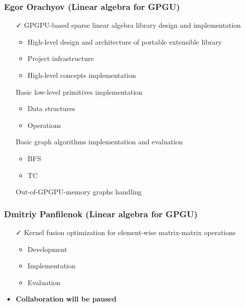 \documentclass[xcolor=table,aspectratio=169]{beamer}
\begin{document}
\begin{frame}[fragile]
  \frametitle{Egor Orachyov (Linear algebra for GPGU)}
  \begin{minipage}[t]{0.48\textwidth}
    \begin{itemize}
      \item[\faCheck] GPGPU-based sparse linear algebra library design and implementation 
      \begin{itemize}
        \item High-level design and architecture of portable extensible library 
        \item Project infrastructure
        \item High-level concepts implementation
      \end{itemize}
    \end{itemize}
  \end{minipage}
  \pause
  \begin{minipage}[t]{0.49\textwidth}
    \begin{itemize}
      \item[\faHourglassHalf] Basic low-level primitives implementation
      \begin{itemize}
        \item Data structures
        \item Operations
      \end{itemize}
      \item[\faHourglassHalf] Basic graph algorithms implementation and evaluation
      \begin{itemize}
        \item BFS
        \item TC
      \end{itemize}
      \item[\faHourglassHalf] Out-of-GPGPU-memory graphs handling
    \end{itemize}
  \end{minipage}
\end{frame}

\begin{frame}[fragile]
  \frametitle{Dmitriy Panfilenok (Linear algebra for GPGU)}
  \begin{minipage}[t]{0.48\textwidth}
    \begin{itemize}
      \item[\faCheck] Kernel fusion optimization for element-wise matrix-matrix operations
      \begin{itemize}
        \item Development
        \item Implementation
        \item Evaluation
      \end{itemize} 
    \end{itemize}
  \end{minipage}
  \pause
  \begin{minipage}[t]{0.48\textwidth}
    \begin{itemize}
      \item \textbf{Collaboration will be paused}
    \end{itemize}
  \end{minipage}
\end{frame}
\end{document}
